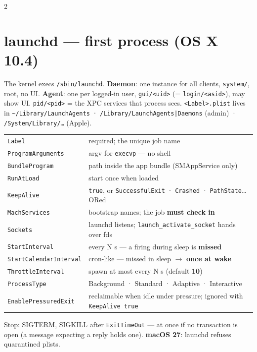 \documentclass[8pt]{extarticle}
\newcommand\ct[1]{\texttt{#1}}
\begin{document}
\begin{multicols}{2}
\columnbreak

\section{launchd — first process (OS X 10.4)}
The kernel execs \ct{/sbin/launchd}. \textbf{Daemon}: one instance for all clients, \ct{system/},
root, no UI. \textbf{Agent}: one per logged-in user, \ct{gui/<uid>} (= \ct{login/<asid>}), may show
UI. \ct{pid/<pid>} = the XPC services that process sees. \ct{<Label>.plist} lives in
\ct{\textasciitilde/Library/LaunchAgents} · \ct{/Library/LaunchAgents|Daemons} (admin) ·
\ct{/System/Library/…} (Apple).

{\scriptsize\setlength\tabcolsep{2.5pt}
\begin{tabular}{@{}>{\raggedright\arraybackslash}p{23mm}>{\raggedright\arraybackslash}p{54mm}@{}}
\toprule
\ct{Label} & required; the unique job name\\
\ct{ProgramArguments} & argv for \ct{execvp} — no shell\\
\ct{BundleProgram} & path inside the app bundle (SMAppService only)\\
\ct{RunAtLoad} & start once when loaded\\
\ct{KeepAlive} & \ct{true}, or \ct{SuccessfulExit} · \ct{Crashed} · \ct{PathState}… ORed\\
\ct{MachServices} & bootstrap names; the job \textbf{must check in}\\
\ct{Sockets} & launchd listens; \ct{launch\_activate\_socket} hands over fds\\
\ct{StartInterval} & every N s — a firing during sleep is \textbf{missed}\\
\ct{StartCalendarInterval} & cron-like — missed in sleep $\to$ \textbf{once at wake}\\
\ct{ThrottleInterval} & spawn at most every N s (default \textbf{10})\\
\ct{ProcessType} & Background · Standard · Adaptive · Interactive\\
\ct{EnablePressuredExit} & reclaimable when idle under pressure; ignored with \ct{KeepAlive true}\\
\bottomrule
\end{tabular}}

Stop: SIGTERM, SIGKILL after \ct{ExitTimeOut} — at once if no transaction is open (a message
expecting a reply holds one). \textbf{macOS 27}: launchd refuses quarantined plists.


\end{multicols}
\end{document}
